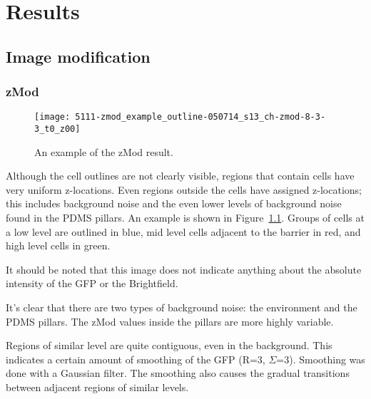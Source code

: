 
\chapter{Results}

\ifpdf
    \graphicspath{{Chapter6/Figs/Raster/}{Chapter6/Figs/PDF/}{Chapter6/Figs/}}
\else
    \graphicspath{{Chapter6/Figs/Vector/}{Chapter6/Figs/}}
\fi

\section{Image modification}

\subsection{zMod}

\begin{figure}[htbp!]
\centering
\texttt{[image: 5111-zmod\_example\_outline-050714\_s13\_ch-zmod-8-3-3\_t0\_z00]}
\caption[zMod example]{An example of the zMod result.}
\label{fig:zmod_result}
\end{figure}

Although the cell outlines are not clearly visible, regions that contain cells have very uniform z-locations. Even regions outside the cells have assigned z-locations; this includes background noise and the even lower levels of background noise found in the PDMS pillars. An example is shown in Figure~\ref{fig:zmod_result}. Groups of cells at a low level are outlined in blue, mid level cells adjacent to the barrier in red, and high level cells in green.

It should be noted that this image does not indicate anything about the absolute intensity of the GFP or the Brightfield.

It's clear that there are two types of background noise: the environment and the PDMS pillars. The zMod values inside the pillars are more highly variable.

Regions of similar level are quite contiguous, even in the background. This indicates a certain amount of smoothing of the GFP (R=3, $\Sigma$=3). Smoothing was done with a Gaussian filter. The smoothing also causes the gradual transitions between adjacent regions of similar levels.

